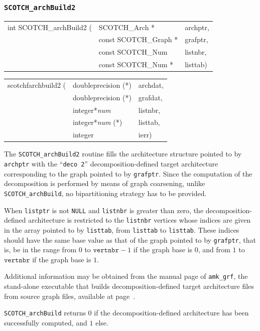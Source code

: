 \subsubsection{{\tt SCOTCH\_archBuild2}}
\label{sec-lib-arch-build-two}

\begin{itemize}
\progsyn

{\tt\begin{tabular}{l@{}ll}
int SCOTCH\_archBuild2 ( & SCOTCH\_Arch *        & archptr, \\
                         & const SCOTCH\_Graph * & grafptr, \\
                         & const SCOTCH\_Num     & listnbr, \\
                         & const SCOTCH\_Num *   & listtab)
\end{tabular}}

{\tt\begin{tabular}{l@{}ll}
scotchfarchbuild2 ( & doubleprecision (*)   & archdat, \\
                    & doubleprecision (*)   & grafdat, \\
                    & integer*{\it num}     & listnbr, \\
                    & integer*{\it num} (*) & listtab, \\
                    & integer               & ierr)
\end{tabular}}

\progdes

The {\tt SCOTCH\_archBuild2} routine fills the architecture structure
pointed to by {\tt archptr} with the ``\texttt{deco 2}''
decomposition-defined target architecture corresponding to the graph
pointed to by {\tt grafptr}. Since the computation of the
decomposition is performed by means of graph coarsening,
unlike {\tt SCOTCH\_\lbt arch\lbt Build}, no bipartitioning strategy
has to be provided.

When {\tt listptr} is not {\tt NULL} and {\tt listnbr} is greater than
zero, the decomposition-defined architecture is restricted to the
{\tt listnbr} vertices whose indices are given in the array pointed to
by {\tt listtab}, from {\tt listtab\lbt [0]} to {\tt listtab\lbt
[listnbr - 1]}. These indices should have the same base value as that
of the graph pointed to by {\tt grafptr}, that is, be in the
range from $0$ to $\mathtt{vertnbr} - 1$ if the graph base is
$0$, and from $1$ to $\mathtt{vertnbr}$ if the graph base is $1$.

Additional information may be obtained from the manual page of
{\tt amk\_\lbt grf}, the stand-alone executable that builds
decomposition-defined target architecture files from source graph
files, available at page~\pageref{sec-prog-amkgrf}.

\progret

{\tt SCOTCH\_archBuild} returns $0$ if the decomposition-defined
architecture has been successfully computed, and $1$ else.
\end{itemize}

